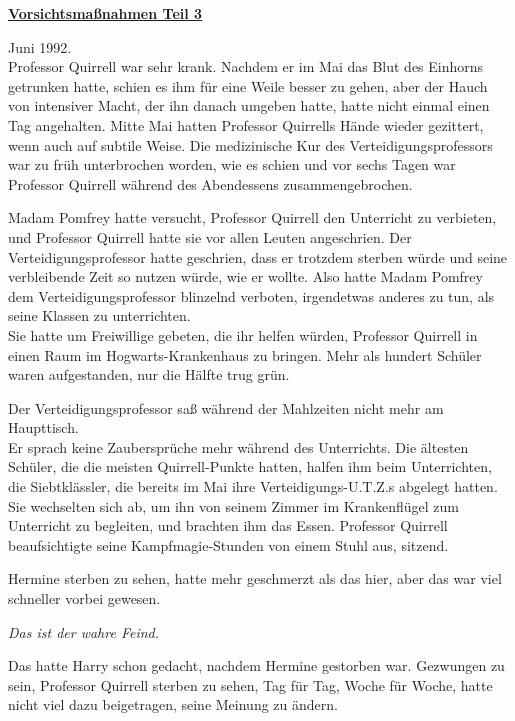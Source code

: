 

\hypertarget{vorsichtsmauxdfnahmen-teil-3}{%

\textbf{\uline{Vorsichtsmaßnahmen Teil 3}}

Juni 1992.\\ Professor Quirrell war sehr krank. Nachdem er im Mai das Blut des Einhorns getrunken hatte, schien es ihm für eine Weile besser zu gehen, aber der Hauch von intensiver Macht, der ihn danach umgeben hatte, hatte nicht einmal einen Tag angehalten. Mitte Mai hatten Professor Quirrells Hände wieder gezittert, wenn auch auf subtile Weise. Die medizinische Kur des Verteidigungsprofessors war zu früh unterbrochen worden, wie es schien und vor sechs Tagen war Professor Quirrell während des Abendessens zusammengebrochen.

Madam Pomfrey hatte versucht, Professor Quirrell den Unterricht zu verbieten, und Professor Quirrell hatte sie vor allen Leuten angeschrien. Der Verteidigungsprofessor hatte geschrien, dass er trotzdem sterben würde und seine verbleibende Zeit so nutzen würde, wie er wollte. Also hatte Madam Pomfrey dem Verteidigungsprofessor blinzelnd verboten, irgendetwas anderes zu tun, als seine Klassen zu unterrichten.\\ Sie hatte um Freiwillige gebeten, die ihr helfen würden, Professor Quirrell in einen Raum im Hogwarts-Krankenhaus zu bringen. Mehr als hundert Schüler waren aufgestanden, nur die Hälfte trug grün.

Der Verteidigungsprofessor saß während der Mahlzeiten nicht mehr am Haupttisch.\\ Er sprach keine Zaubersprüche mehr während des Unterrichts. Die ältesten Schüler, die die meisten Quirrell-Punkte hatten, halfen ihm beim Unterrichten, die Siebtklässler, die bereits im Mai ihre Verteidigungs-U.T.Z.s abgelegt hatten. Sie wechselten sich ab, um ihn von seinem Zimmer im Krankenflügel zum Unterricht zu begleiten, und brachten ihm das Essen. Professor Quirrell beaufsichtigte seine Kampfmagie-Stunden von einem Stuhl aus, sitzend.

Hermine sterben zu sehen, hatte mehr geschmerzt als das hier, aber das war viel schneller vorbei gewesen.

\emph{Das ist der wahre Feind.}

Das hatte Harry schon gedacht, nachdem Hermine gestorben war. Gezwungen zu sein, Professor Quirrell sterben zu sehen, Tag für Tag, Woche für Woche, hatte nicht viel dazu beigetragen, seine Meinung zu ändern.

}
